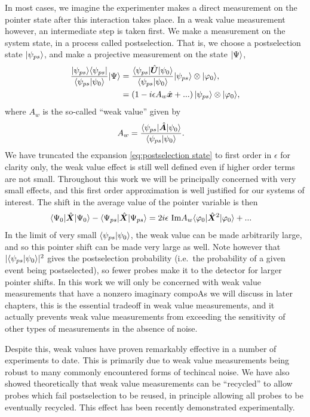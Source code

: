 In most cases, we imagine the experimenter makes a direct measurement on the pointer state after this interaction takes place.  In a weak value measurement however, an intermediate step is taken first.  We make a measurement on the system state, in a process called postselection.  That is, we choose a postselection state $\lvert \psi_{ps}\rangle$, and make a projective measurement on the state $\lvert \Psi\rangle$,
\begin{align}\label{eq:postselection state}
  \nonumber \frac{\lvert \psi_{ps}\rangle\langle \psi_{ps} \rvert}{\langle \psi_{ps} \vert \psi_0 \rangle} \lvert \Psi\rangle &= \frac{\langle \psi_{ps} \rvert\hat{\bm U}\lvert \psi_0\rangle}{\langle \psi_{ps} \vert \psi_0 \rangle}\lvert \psi_{ps}\rangle \otimes \lvert \varphi_0\rangle, \\
                                                                      &= \left(1 - i\epsilon A_w \hat{\bm x} + ...  \right)\lvert \psi_{ps}\rangle \otimes \lvert \varphi_0\rangle,
\end{align}
where $A_w$ is the so-called ``weak value'' given by
\begin{align}
  A_w &= \frac{\langle \psi_{ps} \rvert\hat{\bm A}\lvert \psi_0\rangle}{\langle \psi_{ps} \vert \psi_0 \rangle}.
\end{align}
We have truncated the expansion \eqref{eq:postselection state} to first order in $\epsilon$ for clarity only, the weak value effect is still well defined even if higher order terms are not small.  Throughout this work we will be principally concerned with very small effects, and this first order approximation is well justified for our systems of interest.  The shift in the average value of the pointer variable is then
\begin{align}
  \langle \Psi_0 \rvert\hat{\bm X}\lvert \Psi_0\rangle - \langle \Psi_{ps} \rvert\hat{\bm X}\lvert \Psi_{ps}\rangle &= 2i\epsilon ~\text{Im}{A_w} \langle \varphi_0 \rvert\hat{\bm X}^2\lvert \varphi_0\rangle + ...
\end{align}
In the limit of very small $\langle \psi_{ps} \vert \psi_0 \rangle$, the weak value can be made arbitrarily large, and so this pointer shift can be made very large as well.  Note however that $|\langle \psi_{ps} \vert \psi_0 \rangle|^2$ gives the postselection probability (i.e.~the probability of a given event being postselected), so fewer probes make it to the detector for larger pointer shifts.  In this work we will only be concerned with weak value measurements that have a nonzero imaginary compoAs we will discuss in later chapters, this is the essential tradeoff in weak value measurements, and it actually prevents weak value measurements from exceeding the sensitivity of other types of measurements in the absence of noise.

Despite this, weak values have proven remarkably effective in a number of experiments to date.  This is primarily due to weak value measurements being robust to many commonly encountered forms of techincal noise.  We have also showed theoretically that weak value measurements can be ``recycled'' to allow probes which fail postselection to be reused, in principle allowing all probes to be eventually recycled.  This effect has been recently demonstrated experimentally.

